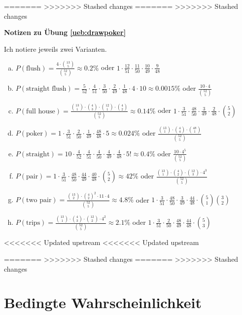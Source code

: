 \documentclass[%
<<<<<<< Updated upstream
<<<<<<< Updated upstream
11pt,%
twoside,%
titlepage,%
german,%
=======
=======
>>>>>>> Stashed changes
11pt,%
twoside,%
titlepage,%
swissgerman,%
<<<<<<< Updated upstream
>>>>>>> Stashed changes
=======
>>>>>>> Stashed changes
headsepline%
]{scrartcl}
\newcommand{\faReturnGray}{\textcolor{gray}{\faMailReply}} %
\theoremstyle{definition}
\theoremstyle{plain}
\newcommand{\concatueb}[1]{ueb:#1}%
\newcommand{\concatlsg}[1]{lsg:#1}%
\newenvironment{lsg}[1]{%
    \par\noindent\textbf{Notizen zu Übung \ref{\concatueb{#1}}}\label{\concatlsg{#1}}
    \hfill\hyperref[\concatueb{#1}]{\faReturnGray}\par %
}{%
    \par%
}
\newcommand{\concatueb}[1]{ueb:#1}%
\newcommand{\concatlsg}[1]{lsg:#1}%
\newenvironment{lsg}[1]{%
    \par\noindent\textbf{Notizen zu Übung \ref{\concatueb{#1}}.}%
    \label{\concatlsg{#1}}
}{%
    \par%
}
\begin{document}
=======
>>>>>>> Stashed changes
=======
>>>>>>> Stashed changes
\begin{lsg}{drawpoker}
Ich notiere jeweils zwei Varianten.
\begin{enumerate}[a)]
\item $P(\text{flush})=\frac{4\cdot\binom{13}{5}}{\binom{52}{5}}\approx0.2\%$ oder $1\cdot\frac{12}{51}\cdot\frac{11}{50}\cdot\frac{10}{49}\cdot\frac{9}{48}$
\item $P(\text{straight flush})=\frac{5}{52}\cdot\frac{4}{51}\cdot\frac{3}{50}\cdot\frac{2}{49}\cdot\frac{1}{48}\cdot4\cdot10\approx0.0015\%$ oder $\frac{10\cdot4}{\binom{52}{5}}$
\item $P(\text{full house})=\frac{\binom{13}{1}\cdot\binom{4}{3}\cdot\binom{12}{1}\cdot\binom{4}{2}}{\binom{52}{5}}\approx0.14\%$ oder $1\cdot\frac{3}{51}\cdot\frac{48}{50}\cdot\frac{3}{49}\cdot\frac{2}{48}\cdot\binom{5}{2}$
\item $P(\text{poker})=1\cdot\frac{3}{51}\cdot\frac{2}{50}\cdot\frac{1}{49}\cdot\frac{48}{48}\cdot 5\approx0.024\%$ oder $\frac{\binom{13}{1}\cdot\binom{4}{4}\cdot\binom{48}{1}}{\binom{52}{5}}$
\item $P(\text{straight})=10\cdot\frac{4}{52}\cdot\frac{4}{51}\cdot\frac{4}{50}\cdot\frac{4}{49}\cdot\frac{4}{48}\cdot 5!\approx0.4\%$ oder $\frac{10\cdot4^5}{\binom{52}{5}}$
\item $P(\text{pair})=1\cdot\frac{3}{51}\cdot\frac{48}{50}\cdot\frac{44}{49}\cdot\frac{40}{48}\cdot\binom{5}{2}\approx42\%$ oder $\frac{\binom{13}{1}\cdot\binom{4}{2}\cdot\binom{12}{3}\cdot4^3}{\binom{52}{5}}$
\item $P(\text{two pair})=\frac{\binom{13}{2}\cdot\binom{4}{2}^{2}\cdot11\cdot 4}{\binom{52}{5}}\approx4.8\%$ oder $1\cdot\frac{3}{51}\cdot\frac{48}{50}\cdot\frac{3}{49}\cdot\frac{44}{48}\cdot\binom{5}{1}\binom{3}{2}$
\item $P(\text{trips})=\frac{\binom{13}{1}\cdot\binom{4}{3}\cdot\binom{12}{2}\cdot4^{2}}{\binom{52}{5}}\approx2.1\%$ oder $1\cdot\frac{3}{51}\cdot\frac{2}{50}\cdot\frac{48}{49}\cdot\frac{44}{48}\cdot\binom{5}{3}$
\end{enumerate}
\end{lsg}

\clearpage

<<<<<<< Updated upstream
<<<<<<< Updated upstream

=======
>>>>>>> Stashed changes
=======
>>>>>>> Stashed changes
\section{Bedingte Wahrscheinlichkeit}
\end{document}
